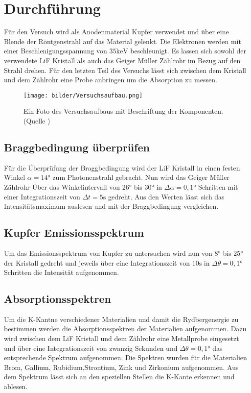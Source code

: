 \section{Durchführung}
\label{sec:Durchfuehrung}
Für den Versuch wird als Anodenmaterial Kupfer verwendet und über eine Blende der Röntgenstrahl auf das Material gelenkt.
Die Elektronen werden mit einer Beschlenigungsspannung von  $35 \text{keV}$ beschleunigt.
Es lassen sich sowohl der verwendete LiF Kristall als auch das Geiger Müller Zählrohr im Bezug auf den Strahl drehen.
Für den letzten Teil des Versuchs lässt sich zwischen dem Kristall und dem Zählrohr eine Probe anbringen um die Absorption zu messen.
\begin{figure}
    \centering
    \texttt{[image: bilder/Versuchsaufbau.png]}
    \caption{Ein Foto des Versuchsaufbaus mit Beschriftung der Komponenten. (Quelle \cite{Anleitung})}
    \label{fig:Versuchsaufbau}
\end{figure}

\subsection{Braggbedingung überprüfen}
Für die Überprüfung der Braggbedingung wird der LiF Kristall in einen festen Winkel $\alpha = 14°$ zum Photonenstrahl gebracht.
Nun wird das Geiger Müller Zählrohr Über das Winkelintervall von 26° bis 30° in $\Delta \alpha = 0,1°$ Schritten mit einer Integrationszeit von $\Delta t = 5 \text{s}$ gedreht.
Aus den Werten lässt sich das Intensitätsmaximum auslesen und mit der Braggbedingung vergleichen.
\subsection{Kupfer Emissionsspektrum}
Um das Emissionsspektrum von Kupfer zu untersuchen wird nun von $8°$ bis $25°$ der Kristall gedreht und jeweils über eine Integrationszeit von $10 \text{s}$ in $\Delta \theta = 0,1°$ Schritten die Intensität aufgenommen.
\subsection{Absorptionsspektren}
Um die K-Kantne verschiedener Materialien und damit die Rydbergenergie zu bestimmen werden die Absorptionsspektren der Materialien aufgenommen.
Dazu wird zwischen dem LiF Kristall und dem Zählrohr eine Metallprobe eingesetzt und über eine Integrationszeit von zwanzig Sekunden und $\Delta \theta = 0,1°$ das entsprechende Spektrum aufgenommen.
Die Spektren wurden für die Materialien Brom, Gallium, Rubidium,Strontium, Zink und Zirkonium aufgenommen.
Aus dem Spektrum lässt sich an den speziellen Stellen die K-Kante erkennen und ablesen.